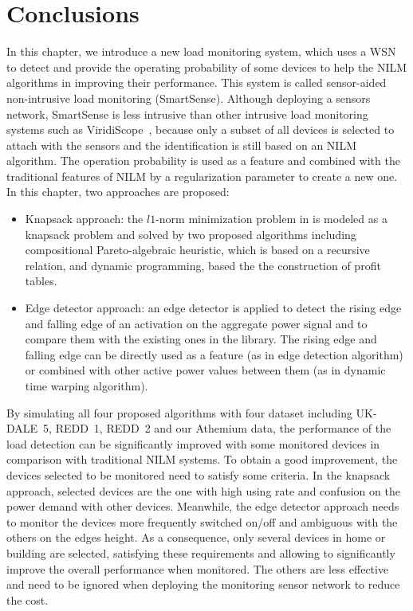 \section{Conclusions}
In this chapter, we introduce a new load monitoring system, which uses a WSN to detect and provide the operating probability of some devices to help the NILM algorithms in improving their performance. This system is called sensor-aided non-intrusive load monitoring (SmartSense). Although deploying a sensors network, SmartSense is less intrusive than other intrusive load monitoring systems such as ViridiScope~\cite{Kim09Ubicomp}, because only a subset of all devices is selected to attach with the sensors and the identification is still based on an NILM algorithm.
The operation probability is used as a feature and combined with the traditional features of NILM by a regularization parameter to create a new one. In this chapter, two approaches are proposed:
\begin{itemize}
\item Knapsack approach: the $l1$-norm minimization problem in \cite{Hart92} is modeled as a knapsack problem and solved by two proposed algorithms including compositional Pareto-algebraic heuristic, which is based on a recursive relation, and dynamic programming, based the the construction of profit tables.
\item Edge detector approach: an edge detector is applied to detect the rising edge and falling edge of an activation on the aggregate power signal and to compare them with the existing ones in the library. The rising edge and falling edge can be directly used as a feature (as in edge detection algorithm) or combined with other active power values between them (as in dynamic time warping algorithm).
\end{itemize}

By simulating all four proposed algorithms with four dataset including UK-DALE~5, REDD~1, REDD~2 and our Athemium data, the performance of the load detection can be significantly improved with some monitored devices in comparison with traditional NILM systems. To obtain a good improvement, the devices selected to be monitored need to satisfy some criteria. In the knapsack approach, selected devices are the one with high using rate and confusion on the power demand with other devices. Meanwhile, the edge detector approach needs to monitor the devices more frequently switched on/off and ambiguous with the others on the edges height.
As a consequence, only several devices in home or building are selected, satisfying these requirements and allowing to significantly improve the overall performance when monitored. The others are less effective and need to be ignored when deploying the monitoring sensor network to reduce the cost. 

